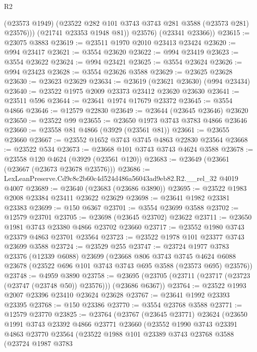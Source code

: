 \begin{lexlean}{R2}
\begin{coremodule}
              (@23573 @1949)
              (@23522 @282 @101 @3743 @3743 @281 @3588 (@23573 @281) @23576)))
          (@21741 @23353 @1948 @81))
        @23576)
      (@23341 @23366))
@23615 := @23075 @3883
@23619 := @23511 @1970 @2010 @23413 @23424
@23620 := @994 @23417
@23621 := @3554 @23620
@23622 := @994 @23419
@23623 := @3554 @23622
@23624 := @994 @23421
@23625 := @3554 @23624
@23626 := @994 @23423
@23628 := @3554 @23626 @3588
@23629 := @23625 @23628
@23630 := @23623 @23629
@23634 := @23619 (@23621 @23630) (@994 @23434)
@23640 := @23522 @1975 @2009 @23373 @23412 @23620 @23630
@23641 := @23511 @596
@23644 := @23641 @1974 @17679 @23372
@23645 := @3554 @4866
@23646 := @12579 @22830
@23649 := @23644 (@23645 @23646) @23620
@23650 := @23522 @99
@23655 := @23650 @1973 @3743 @3783 @4866 @23646
@23660 := @23558 @81 @4866 (@3929 (@23561 @81))
@23661 := @23655 @23660
@23667 := @23552 @1652 @3743 @3745 @4863 @22830 @23564
@23668 := @23522 @534
@23673 := @23668 @101 @3743 @3743 @4624 @3588
@23678 := @23558 @120 @4624 (@3929 (@23561 @120))
@23683 := @23649 (@23661 (@23667 (@23673 @23678 @23576)))
@23686 := LexLeanPreserve.Cd9c8c2b60c4d524d486a56043ad9eb82.R2.__rel_32 @4019 @4007
@23689 := @23640 (@23683 (@23686 @3890))
@23695 := @23522 @1983 @2008 @23384 @23411 @23622 @23629
@23698 := @23641 @1982 @23381 @23383
@23699 := @150 @6367
@23701 := @3554 @23699 @3588
@23702 := @12579 @23701
@23705 := @23698 (@23645 @23702) @23622
@23711 := @23650 @1981 @3743 @23380 @4866 @23702 @23660
@23717 := @23552 @1980 @3743 @23379 @4863 @23701 @23564
@23723 := @23522 @1978 @101 @23377 @3743 @23699 @3588
@23724 := @23529 @255
@23747 := @23724
    @1977
    @3783
    @23376
    (@12339 @6088)
    @23699
    (@23668
      @806
      @3743
      @3745
      @4624
      @6088
      @23678
      (@23522 @696 @101 @3743 @3743 @695 @3588 (@23573 @695) @23576))
@23748 := @4959 @3890
@23758 := @23695 (@23705 (@23711 (@23717 (@23723 (@23747 (@23748 @50)) @23576))) (@23686 @6367))
@23764 := @23522 @1993 @2007 @23396 @23410 @23624 @23628
@23767 := @23641 @1992 @23393 @23395
@23768 := @150 @23386
@23770 := @3554 @23768 @3588
@23771 := @12579 @23770
@23825 := @23764
    (@23767
      (@23645 @23771)
      @23624
      (@23650
        @1991
        @3743
        @23392
        @4866
        @23771
        @23660
        (@23552
          @1990
          @3743
          @23391
          @4863
          @23770
          @23564
          (@23522
            @1988
            @101
            @23389
            @3743
            @23768
            @3588
            (@23724
              @1987
              @3783

\end{coremodule}
\end{lexlean}
